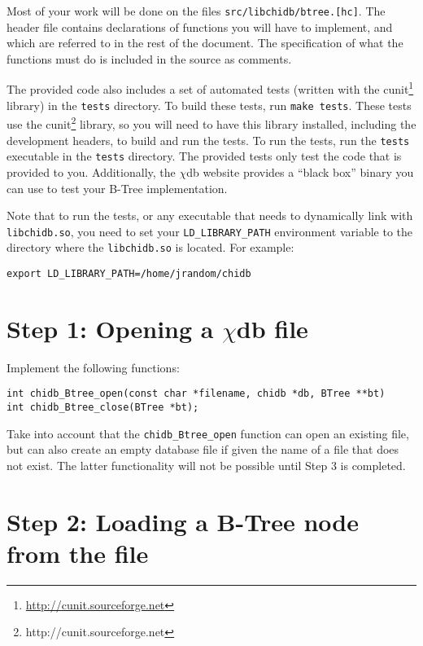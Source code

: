 \documentclass[10pt]{article}
\newcommand{\chidb}{$\chi$\textsf{db}}
\begin{document}
Most of your work will be done on the files \texttt{src/libchidb/btree.[hc]}. The header file contains declarations of functions you will have to implement, and which are referred to in the rest of the document. The specification of what the functions must do is included in the source as comments.

The provided code also includes a set of automated tests (written with the cunit\footnote{\url{http://cunit.sourceforge.net}} library) in the \texttt{tests} directory. To build these tests, run \texttt{make tests}. These tests use the cunit\footnote{http://cunit.sourceforge.net} library, so you will need to have this library installed, including the development headers, to build and run the tests. To run the tests, run the \texttt{tests} executable in the \texttt{tests} directory. The provided tests only test the code that is provided to you. Additionally, the \chidb{} website provides a ``black box'' binary you can use to test your B-Tree implementation.

Note that to run the tests, or any executable that needs to dynamically link with \texttt{libchidb.so}, you need to set your \verb+LD_LIBRARY_PATH+ environment variable to the directory where the \texttt{libchidb.so} is located. For example:

\begin{verbatim}
export LD_LIBRARY_PATH=/home/jrandom/chidb
\end{verbatim}

\section*{Step 1: Opening a \chidb{} file}

Implement the following functions:

\begin{verbatim}
int chidb_Btree_open(const char *filename, chidb *db, BTree **bt)
int chidb_Btree_close(BTree *bt);
\end{verbatim}

Take into account that the \verb+chidb_Btree_open+ function can open an existing file, but can also create an empty database file if given the name of a file that does not exist. The latter functionality will not be possible until Step 3 is completed.

\section*{Step 2: Loading a B-Tree node from the file}
\end{document}
